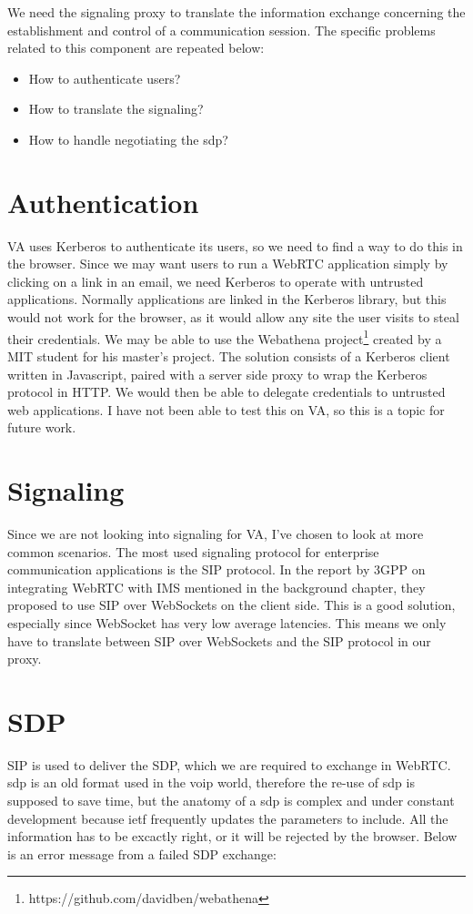 We need the signaling proxy to translate the information exchange concerning the establishment and control of a communication session. The specific problems related to this component are repeated below:

\begin{itemize}
\item{How to authenticate users?}
\item{How to translate the signaling?}
\item{How to handle negotiating the \gls{sdp}?}
\end{itemize}

\section{Authentication}
VA uses Kerberos to authenticate its users, so we need to find a way to do this in the browser. Since we may want users to run a WebRTC application simply by clicking on a link in an email, we need Kerberos to operate with untrusted applications. Normally applications are linked in the Kerberos library, but this would not work for the browser, as it would allow any site the user visits to steal their credentials\cite{webathena}. We may be able to use the Webathena project\footnote{https://github.com/davidben/webathena} created by a MIT student for his master's project\cite{webathena}. The solution consists of a Kerberos client written in Javascript, paired with a server side proxy to wrap the Kerberos protocol in HTTP. We would then be able to delegate credentials to untrusted web applications. I have not been able to test this on VA, so this is a topic for future work.

\section{Signaling}
Since we are not looking into signaling for VA, I've chosen to look at more common scenarios. The most used signaling protocol for enterprise communication applications is the SIP protocol. In the report by 3GPP\cite{3gpp-wrtc-access-ims} on integrating WebRTC with IMS mentioned in the background chapter, they proposed to use SIP over WebSockets on the client side. This is a good solution, especially since WebSocket has very low average latencies\cite{websocket-overhead}. This means we only have to translate between SIP over WebSockets and the SIP protocol in our proxy.

\section{SDP}
SIP is used to deliver the SDP, which we are required to exchange in WebRTC. \gls{sdp} is an old format used in the \gls{voip} world, therefore the re-use of \gls{sdp} is supposed to save time, but the anatomy of a \gls{sdp} is complex and under constant development because \gls{ietf} frequently updates the parameters to include. All the information has to be excactly right, or it will be rejected by the browser. Below is an error message from a failed SDP exchange:

